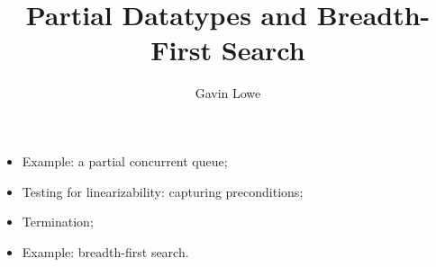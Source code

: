 \documentclass[notes,color]{sepslide0}
\title{Partial Datatypes and Breadth-First Search}
\author{Gavin Lowe}
\begin{document}
\begin{slide}
  
  \Title


\end{slide}



\begin{slide}

\begin{itemize}
\item 
Example: a partial concurrent queue;

\item
Testing for linearizability: capturing preconditions;

\item 
Termination;

\item Example: breadth-first search.
\end{itemize}
\end{slide}
\end{document}
